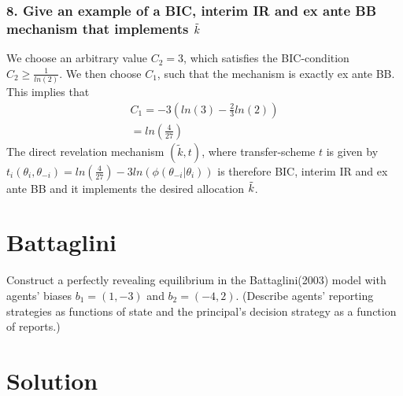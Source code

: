 \documentclass[a4paper]{article}
\newif\ifsolutions
\begin{document}
	
	\subsubsection*{8. Give an example of a BIC, interim IR and ex ante BB mechanism that implements $\Tilde{k}$}
	We choose an arbitrary value $C_2=3$, which satisfies the BIC-condition $C_2\geq \frac{1}{ln(2)}$. We then choose $C_1$, such that the mechanism is exactly ex ante BB. This implies that 
	\begin{align}
		C_1=-3(ln(3)-\frac{2}{3}ln(2))\nonumber\\
		=ln(\frac{4}{27})
	\end{align}
	The direct revelation mechanism $(\tilde{k},t)$, where transfer-scheme $t$ is given by $t_i(\theta_i,\theta_{-i})=ln(\frac{4}{27})-3ln(\phi(\theta_{-i}|\theta_{i}))$ is therefore BIC, interim IR and ex ante BB and it implements the desired allocation $\Tilde{k}$.

\fi



\section{Battaglini}
	
	Construct a perfectly revealing equilibrium in the Battaglini(2003) model with agents' biases $b_1 = (1, -3)$ and $b_2 = (-4, 2)$. (Describe agents' reporting strategies as functions of state and the principal's decision strategy as a function of reports.)

\ifsolutions
\section*{Solution}
	
\end{document}
